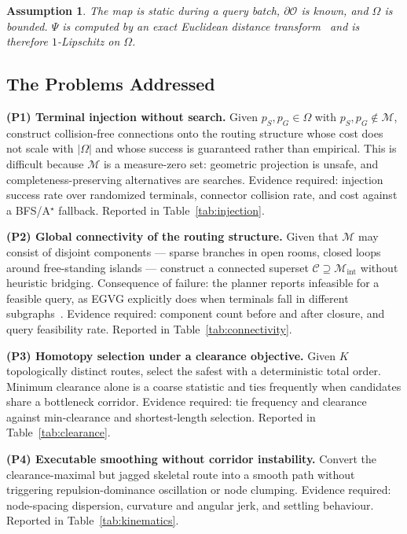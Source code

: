 \documentclass[conference]{IEEEtran}
\newtheorem{assumption}{Assumption}
\begin{document}
\begin{assumption}
The map is static during a query batch, $\partial\mathcal{O}$ is known, and $\Omega$ is bounded. $\Psi$ is computed by an exact Euclidean distance transform~\cite{felzenszwalb2012} and is therefore $1$-Lipschitz on $\Omega$.
\end{assumption}

\subsection{The Problems Addressed}

\textbf{(P1) Terminal injection without search.} Given $p_S,p_G\in\Omega$ with $p_S,p_G\notin\mathcal{M}$, construct collision-free connections onto the routing structure whose cost does not scale with $|\Omega|$ and whose success is guaranteed rather than empirical. This is difficult because $\mathcal{M}$ is a measure-zero set: geometric projection is unsafe, and completeness-preserving alternatives are searches. Evidence required: injection success rate over randomized terminals, connector collision rate, and cost against a BFS/A$^\star$ fallback. Reported in Table~\ref{tab:injection}.

\textbf{(P2) Global connectivity of the routing structure.} Given that $\mathcal{M}$ may consist of disjoint components --- sparse branches in open rooms, closed loops around free-standing islands --- construct a connected superset $\mathcal{C}\supseteq\mathcal{M}_{\mathrm{int}}$ without heuristic bridging. Consequence of failure: the planner reports infeasible for a feasible query, as EGVG explicitly does when terminals fall in different subgraphs~\cite{qi2025egvg}. Evidence required: component count before and after closure, and query feasibility rate. Reported in Table~\ref{tab:connectivity}.

\textbf{(P3) Homotopy selection under a clearance objective.} Given $K$ topologically distinct routes, select the safest with a deterministic total order. Minimum clearance alone is a coarse statistic and ties frequently when candidates share a bottleneck corridor. Evidence required: tie frequency and clearance against min-clearance and shortest-length selection. Reported in Table~\ref{tab:clearance}.

\textbf{(P4) Executable smoothing without corridor instability.} Convert the clearance-maximal but jagged skeletal route into a smooth path without triggering repulsion-dominance oscillation or node clumping. Evidence required: node-spacing dispersion, curvature and angular jerk, and settling behaviour. Reported in Table~\ref{tab:kinematics}.
\end{document}
